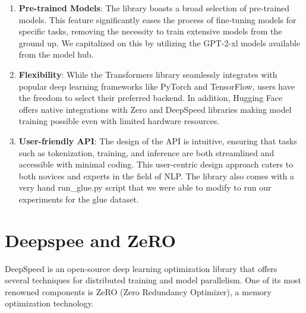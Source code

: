 \documentclass[\main/thesis.tex]{subfiles}
\begin{document}
\begin{enumerate}
    \item \textbf{Pre-trained Models}: The library boasts a broad selection of pre-trained models. This feature significantly eases the 
    process of fine-tuning models for specific tasks, removing the necessity to train extensive models from the ground up. We capitalized on this 
    by utilizing the GPT-2-xl models available from the model hub. 
    
    \item \textbf{Flexibility}: While the Transformers library seamlessly integrates with popular deep learning frameworks like 
    PyTorch and TensorFlow, users have the freedom to select their preferred backend. In addition, Hugging Face offers native integrations with 
    Zero and DeepSpeed libraries making model training possible even with limited hardware resources. 
    
    \item \textbf{User-friendly API}: The design of the API is intuitive, ensuring that tasks such as tokenization, 
    training, and inference are both streamlined and accessible with minimal coding. This user-centric design approach caters to 
    both novices and experts in the field of NLP. The library also comes with a very hand run\_glue.py script that we were able to modify to 
    run our experiments for the glue dataset.

\end{enumerate}


\section{Deepspee and ZeRO}\label{sec:DeepSpeed}

DeepSpeed\cite{rajbhandari_zero_2020} is an open-source deep learning optimization library that offers several techniques for distributed 
training and model parallelism. One of its most renowned components is ZeRO (Zero Redundancy Optimizer), a memory optimization technology.
\end{document}
